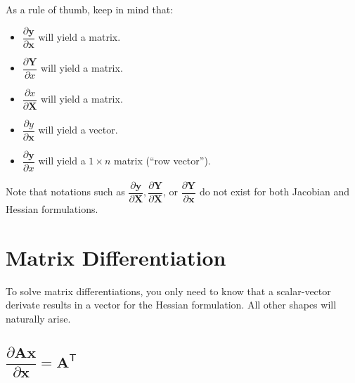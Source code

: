 \documentclass{article}
\newcommand{\trans}{\mathsf{T}}
\begin{document}
\newpage
As a rule of thumb, keep in mind that:
\begin{itemize}
    \item \(\dfrac{\partial \mathbf{y}}{\partial \mathbf{x}}\) will yield a matrix.
    \item \(\dfrac{\partial \mathbf{Y}}{\partial x}\) will yield a matrix.
    \item \(\dfrac{\partial x}{\partial \mathbf{X}}\) will yield a matrix.
    \item \(\dfrac{\partial y}{\partial \mathbf{x}}\) will yield a vector.
    \item \(\dfrac{\partial \mathbf{y}}{\partial x}\) will yield a \(1\times n\) matrix (``row vector'').
\end{itemize}

Note that notations such as \(\dfrac{\partial \mathbf{y}}{\partial \mathbf{X}}, \dfrac{\partial \mathbf{Y}}{\partial \mathbf{X}}\), or \(\dfrac{\partial \mathbf{Y}}{\partial \mathbf{x}}\) do not exist for both Jacobian and Hessian formulations.

\section{Matrix Differentiation}\label{sec:diff}
To solve matrix differentiations, you only need to know that a scalar-vector derivate results in a vector for the Hessian formulation. All other shapes will naturally arise.

\subsection{\(\dfrac{\partial \mathbf{A} \mathbf{x}}{\partial \mathbf{x}} = \mathbf{A}^\trans\)}
\end{document}
